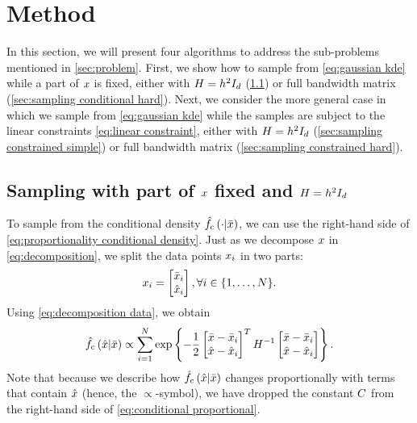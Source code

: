 \section{Method}
\label{sec:method}

\cstarta In this section, we will present four algorithms to address the sub-problems mentioned in \cref{sec:problem}.
First, we show how to sample from \cref{eq:gaussian kde} while a part of $x$ is fixed, either with $H=h^2I_{d}$ (\cref{sec:sampling conditional simple}) or full bandwidth matrix (\cref{sec:sampling conditional hard}).
Next, we consider the more general case in which we sample from \cref{eq:gaussian kde} while the samples are subject to the linear constraints \cref{eq:linear constraint}, either with $H=h^2I_{d}$ (\cref{sec:sampling constrained simple}) or full bandwidth matrix (\cref{sec:sampling constrained hard}). \cenda



\subsection{Sampling with part of $x$ fixed and $H=h^2I_{d}$}
\label{sec:sampling conditional simple}

To sample from the conditional density $\hat{f}_{\mathrm{c}}\left( \cdot | \bar{x} \right)$, we can use the right-hand side of \cref{eq:proportionality conditional density}.
Just as we decompose $x$ in \cref{eq:decomposition}, we split the data points $x_{i}$ in two parts:
\begin{equation}
	\label{eq:decomposition data}
	x_{i} = \begin{bmatrix}
		\bar{x}_{i} \\ \hat{x}_{i}
	\end{bmatrix}, \forall i \in \{1,\ldots,N\}.
\end{equation}
Using \cref{eq:decomposition data}, we obtain
\begin{equation}
	\label{eq:conditional proportional}
	\hat{f}_{\mathrm{c}}\left( \hat{x} | \bar{x} \right)
	\propto \sum_{i=1}^{N} 
	\exp\left\{ 
		-\frac{1}{2} 
		\begin{bmatrix}
			\bar{x} - \bar{x}_{i} \\ 
			\hat{x} - \hat{x}_{i}
		\end{bmatrix}^T 
		H^{-1}
		\begin{bmatrix}
			\bar{x} - \bar{x}_{i} \\ 
			\hat{x} - \hat{x}_{i}
		\end{bmatrix}
	 \right\}.
\end{equation}
\cstarta Note that because we describe how $\hat{f}_{\mathrm{c}}\left( \hat{x} | \bar{x} \right)$ changes proportionally with terms that contain $\hat{x}$ (hence, the $\propto$-symbol), we have dropped the constant $C$ from the right-hand side of \cref{eq:conditional proportional}. \cenda

